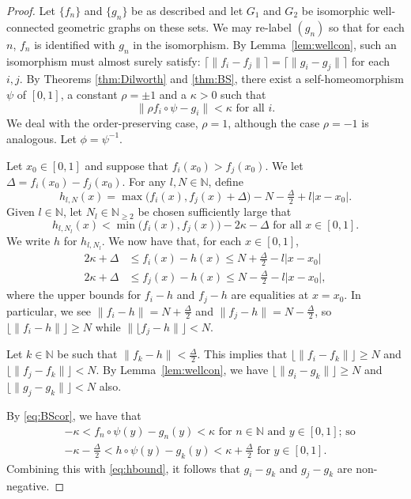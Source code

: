 \documentclass{daj}
\newcommand{\N}{\mathbb N}
\begin{document}
\begin{proof}
Let $\{f_n\}$ and $\{g_n\}$ be as described and let $G_1$ and $G_2$ be isomorphic
well-connected geometric graphs on these sets. We may re-label $(g_n)$ so that for each $n$,
$f_n$ is identified with $g_n$ in the isomorphism. By Lemma~\ref{lem:wellcon},
such an isomorphism must almost surely satisfy:
$\lceil \|f_i-f_j\|\rceil = \lceil \|g_i-g_j\|\rceil$
for each $i,j$. By Theorems \ref{thm:Dilworth} and \ref{thm:BS},
there exist a self-homeomorphism $\psi$ of $[0,1]$, a constant
$\rho=\pm 1$ and a $\kappa>0$ such that
\begin{equation}
\|\rho f_i\circ\psi-g_i\|<\kappa\text{ for all $i$.}\label{eq:BScor}
\end{equation}
We deal with the order-preserving case, $\rho=1$, although the case $\rho=-1$
is analogous. Let $\phi=\psi^{-1}$.

Let $x_0\in [0,1]$ and suppose that $f_i(x_0)>f_j(x_0)$. We let
$\Delta=f_i(x_0)-f_j(x_0)$. For any $l,N\in\N$, define
$$
h_{l,N}(x)=\max\big(f_i(x),f_j(x)+\Delta\big)-N-\tfrac\Delta 2+l|x-x_0|.
$$
Given $l\in\N$, let $N_l\in\N_{\ge 2}$ be chosen
sufficiently large that
\begin{equation}\label{eq:hbound}
h_{l,N_l}(x)<\min\big(f_i(x),f_j(x)\big)-2\kappa-\Delta\text{ for all $x\in[0,1]$.}
\end{equation}
We write $h$ for $h_{l,N_l}$. We now have that, for each $x\in [0,1]$,
\begin{align*}
2\kappa+\Delta&\le f_i(x)-h(x)\le N+\tfrac\Delta 2-l|x-x_0|\\
2\kappa+\Delta&\le f_j(x)-h(x)\le N-\tfrac\Delta 2-l|x-x_0|,
\end{align*}
where the upper bounds for $f_i-h$ and $f_j-h$ are equalities at $x=x_0$.
In particular, we see $\|f_i-h\|=N+\frac\Delta2$ and $\|f_j-h\|=N-\frac\Delta2$, so
$\lfloor\| f_i-h\|\rfloor\ge  N$ while $\|\lfloor f_j-h\|\rfloor < N$.

Let $k\in\N$ be such that $\|f_k-h\|<\frac\Delta2$. This implies
that $\lfloor \|f_i-f_k\|\rfloor\ge  N$
and $\lfloor \|f_j-f_k\|\rfloor< N$. By Lemma~\ref{lem:wellcon}, we
have $\lfloor \|g_i-g_k\|\rfloor\ge N$ and $\lfloor \|g_j-g_k\|\rfloor< N$ also.

By \eqref{eq:BScor}, we have that
\begin{align*}
	&-\kappa<f_n\circ\psi(y)-g_n(y)<\kappa\text{ for $n\in\N$ and $y\in[0,1]$; so}\\
	&-\kappa-\tfrac\Delta2<h\circ\psi(y)-g_k(y)<\kappa+\tfrac\Delta2\text{ for $y\in[0,1]$}.
\end{align*}
Combining this with \eqref{eq:hbound}, it follows that $g_i-g_k$ and $g_j-g_k$ are non-negative.


\end{proof}
\end{document}
